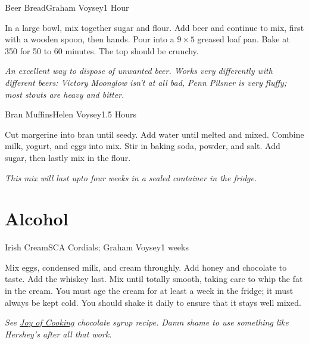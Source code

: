 \documentclass{book}
\begin{document}
\begin{recipe}{Beer Bread}{Graham Voysey}{1 Hour}

  In a large bowl,  mix together sugar and flour. Add beer and continue to
  mix, first with a wooden spoon, then hands. Pour into a $9\times 5$ greased
  loaf pan. Bake at 350 for 50 to 60 minutes. The top should be crunchy.
\end{recipe}
\textit{An excellent way to dispose of unwanted beer. Works very differently
  with different beers: Victory Moonglow isn't at all bad, Penn Pilsner is
  very fluffy; most stouts are heavy and bitter.}


\begin{recipe}{Bran Muffins}{Helen Voysey}{1.5 Hours}

  Cut margerine into bran until seedy. Add water until melted and
  mixed. Combine milk, yogurt, and eggs into mix. Stir in baking soda, powder,
  and salt. Add sugar, then lastly mix in the flour.
\end{recipe}

\textit{This mix will last upto four weeks in a sealed container in the
  fridge.}

\chapter{Alcohol}
\begin{recipe}{Irish Cream}{SCA Cordials; Graham Voysey}{1 weeks}
  
  Mix eggs, condensed milk, and cream throughly. Add honey and chocolate to
  taste. Add the whiskey last. Mix until totally smooth, taking care to whip
  the fat in the cream. You must age the cream for at least a week in the
  fridge; it must always be kept cold. You should shake it daily to ensure
  that it stays well mixed.
\end{recipe}

\textit{See \underline{Joy of Cooking} chocolate syrup recipe. Damn shame to
  use something like Hershey's after all that work.}
\end{document}
